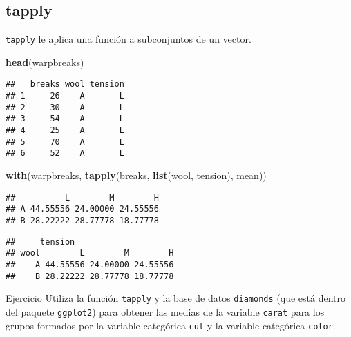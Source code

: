 \documentclass[]{article}
\newenvironment{Shaded}{\begin{snugshade}}{\end{snugshade}}
\newcommand{\KeywordTok}[1]{\textcolor[rgb]{0.13,0.29,0.53}{\textbf{#1}}}
\newcommand{\DataTypeTok}[1]{\textcolor[rgb]{0.13,0.29,0.53}{#1}}
\newcommand{\OperatorTok}[1]{\textcolor[rgb]{0.81,0.36,0.00}{\textbf{#1}}}
\newcommand{\NormalTok}[1]{#1}
\begin{document}
\subsection{tapply}\label{tapply}

\texttt{tapply} le aplica una función a subconjuntos de un vector.

\begin{Shaded}
\begin{Highlighting}[]
\KeywordTok{head}\NormalTok{(warpbreaks)}
\end{Highlighting}
\end{Shaded}

\begin{verbatim}
##   breaks wool tension
## 1     26    A       L
## 2     30    A       L
## 3     54    A       L
## 4     25    A       L
## 5     70    A       L
## 6     52    A       L
\end{verbatim}

\begin{Shaded}
\begin{Highlighting}[]
\KeywordTok{with}\NormalTok{(warpbreaks, }\KeywordTok{tapply}\NormalTok{(breaks, }\KeywordTok{list}\NormalTok{(wool, tension), mean))}
\end{Highlighting}
\end{Shaded}

\begin{verbatim}
##          L        M        H
## A 44.55556 24.00000 24.55556
## B 28.22222 28.77778 18.77778
\end{verbatim}

\begin{Shaded}
\end{Shaded}

\begin{verbatim}
##     tension
## wool        L        M        H
##    A 44.55556 24.00000 24.55556
##    B 28.22222 28.77778 18.77778
\end{verbatim}

\renewcommand\bcStyleTitre[1]{\large\textcolor{bbblack}{#1}}

\begin{bclogo}[
  couleur=llred,
  arrondi=0,
  logo=\bcstop,
  barre=none,
  noborder=true]{Ejercicio}
Utiliza la función \texttt{tapply} y la base de datos \texttt{diamonds} (que está
dentro del paquete \texttt{ggplot2}) para obtener las medias de la 
variable \texttt{carat} para los grupos
formados por la variable categórica \texttt{cut} y la variable categórica
\texttt{color}.
\end{bclogo}
\end{document}
